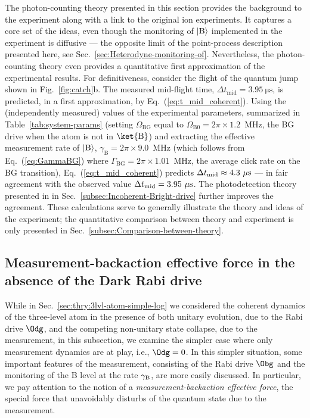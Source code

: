 The photon-counting theory presented in this section provides the
background to the experiment along with a link to the original ion
experiments. It captures a core set of the ideas, even though the
monitoring of $|{\rm B\rangle}$ implemented in the experiment is
diffusive — the opposite limit of the point-process description presented
here, see Sec.~\ref{sec:Heterodyne-monitoring-of}. Nevertheless,
the photon-counting theory even provides a quantitative first approximation
of the experimental results. For definitiveness, consider the flight
of the quantum jump shown in Fig.~\ref{fig:catch}b. The measured
mid-flight time, $\Delta t_{\mathrm{mid}}=3.95~\mathrm{\mu s}$, is
predicted, in a first approximation, by Eq.~(\ref{eq:t_mid_coherent}).
Using the (independently measured) values of the experimental parameters,
summarized in Table~\ref{tab:system-params} (setting $\Omega_{\mathrm{BG}}$
equal to $\Omega_{\mathrm{B0}}=2\pi\times1.2$~MHz, the BG drive
when the atom is not in $\ket{\rm B}$) and extracting the effective
measurement rate of $|{\rm B\rangle}$, $\gamma_{\mathrm{B}}=2\pi\times9.0$~MHz
(which follows from Eq.~(\ref{eq:GammaBG}) where $\Gamma_{\mathrm{BG}}=2\pi\times1.01$~MHz,
the average click rate on the BG transition), Eq.~(\ref{eq:t_mid_coherent})
predicts $\Delta t_{{\rm mid}}\approx4.3~\mathrm{\mu s}$ — in fair
agreement with the observed value $\Delta t_{{\rm mid}}=3.95~\mathrm{\mu s}$.
The photodetection theory presented in in Sec.~\ref{subsec:Incoherent-Bright-drive}
further improves the agreement. These calculations serve to generally
illustrate the theory and ideas of the experiment; the quantitative
comparison between theory and experiment is only presented in Sec.~\ref{subsec:Comparison-between-theory}.

\subsection{Measurement-backaction effective force in the absence of the Dark
Rabi drive\label{subsec:Knowledge-driven-force-in}}

While in Sec.~\ref{sec:thry:3lvl-atom-simple-log} we considered
the coherent dynamics of the three-level atom in the presence of  both
unitary evolution, due to the Rabi drive $\Odg$, and the competing
non-unitary state collapse, due to the measurement, in this subsection,
we examine the simpler case where only measurement dynamics are at
play, i.e., $\Odg=0$. In this simpler situation, some important features
of the measurement, consisting of the Rabi drive $\Obg$ and the monitoring
of the B level at the rate $\gamma_{{\rm B}}$, are more easily discussed.
In particular, we pay attention to the notion of a\emph{ measurement-backaction
effective force}, the special force that unavoidably disturbs of the
quantum state due to the measurement. 

